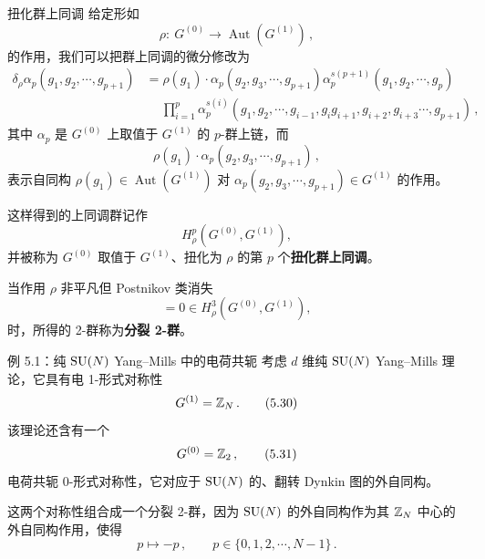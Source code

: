 \begin{notebox}{扭化群上同调}
给定形如
\begin{equation}
  \rho:\ G^{(0)}\to\operatorname{Aut}(G^{(1)})\,, \tag{5.25}
\end{equation}
的作用，我们可以把群上同调的微分修改为
\begin{align}
  \delta_\rho\alpha_p(g_1,g_2,\cdots,g_{p+1})
  &=\rho(g_1)\cdot\alpha_p(g_2,g_3,\cdots,g_{p+1})\alpha_p^{s(p+1)}(g_1,g_2,\cdots,g_p)\nonumber\\
  &\quad\ \prod_{i=1}^{p}\alpha_p^{s(i)}(g_1,g_2,\cdots,g_{i-1},g_ig_{i+1},g_{i+2},g_{i+3}\cdots,g_{p+1})\,, \tag{5.26}
\end{align}
其中 $\alpha_p$ 是 $G^{(0)}$ 上取值于 $G^{(1)}$ 的 $p$-群上链，而
\begin{equation}
  \rho(g_1)\cdot\alpha_p(g_2,g_3,\cdots,g_{p+1})\,, \tag{5.27}
\end{equation}
表示自同构 $\rho(g_1)\in\operatorname{Aut}(G^{(1)})$ 对 $\alpha_p(g_2,g_3,\cdots,g_{p+1})\in G^{(1)}$ 的作用。

这样得到的上同调群记作
\begin{equation}
  H^p_\rho\left(G^{(0)},G^{(1)}\right), \tag{5.28}
\end{equation}
并被称为 $G^{(0)}$ 取值于 $G^{(1)}$、扭化为 $\rho$ 的第 $p$ 个\textbf{扭化群上同调}。
\end{notebox}


当作用 $\rho$ 非平凡但 Postnikov 类消失
\begin{equation}
  [\Theta]=0\in H^3_\rho\left(G^{(0)},G^{(1)}\right), \tag{5.29}
\end{equation}
时，所得的 2-群称为\textbf{分裂 2-群}。

\begin{examplebox}{例 5.1：纯 $\mathrm{SU}(N)$ Yang--Mills 中的电荷共轭}
考虑 $d$ 维纯 $\mathrm{SU}(N)$ Yang--Mills 理论，它具有电 1-形式对称性
\begin{equation}
  G^{(1)}=\mathbb{Z}_N\,. \tag{5.30}
\end{equation}
该理论还含有一个
\begin{equation}
  G^{(0)}=\mathbb{Z}_2\,, \tag{5.31}
\end{equation}
电荷共轭 0-形式对称性，它对应于 $\mathrm{SU}(N)$ 的、翻转 Dynkin 图的外自同构。

这两个对称性组合成一个分裂 2-群，因为 $\mathrm{SU}(N)$ 的外自同构作为其 $\mathbb{Z}_N$ 中心的外自同构作用，使得
\begin{equation}
  p\longmapsto-p\,,\qquad p\in\{0,1,2,\cdots,N-1\}\,. \tag{5.32}
\end{equation}
\end{examplebox}

